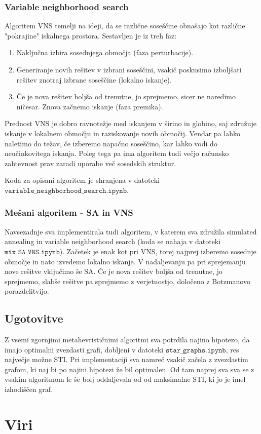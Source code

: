 \documentclass[a4paper,12pt]{article}
\begin{document}
\subsubsection{Variable neighborhood search}
Algoritem VNS temelji na ideji, da se različne soseščine obnašajo kot različne "pokrajine" iskalnega prostora. Sestavljen je iz treh faz:
\begin{enumerate}
      \item Naključna izbira sosednjega območja (faza perturbacije).
      \item Generiranje novih rešitev v izbrani soseščini, vsakič poskusimo izboljšati rešitev znotraj izbrane soseščine (lokalno iskanje).
      \item Če je nova rešitev boljša od trenutne, jo sprejmemo, sicer ne naredimo ničesar. Znova začnemo iskanje (faza premika).
\end{enumerate}
Prednost VNS je dobro ravnotežje med iskanjem v širino in globino, saj združuje iskanje v lokalnem območju in raziskovanje novih območij. Vendar
pa lahko naletimo do težav, če izberemo napačno soseščino, kar lahko vodi do neučinkovitega iskanja. Poleg tega pa ima algoritem tudi večjo
računsko zahtevnost prav zaradi uporabe več sosedskih struktur.

Koda za opisani algoritem je shranjena v datoteki \\$\texttt{variable\_neighborhood\_search.ipynb}$.

\subsubsection{Mešani algoritem - SA in VNS}
Navsezadnje sva implementirala tudi algoritem, v katerem sva združila simulated annealing in variable neighborhood search (koda se nahaja
v datoteki $\texttt{mix\_SA\_VNS.ipynb}$). Začetek je enak kot pri VNS, torej najprej izberemo sosednje območje in nato izvedemo lokalno iskanje. 
V nadaljevanju pa pri sprejemanju nove rešitve vključimo še SA. Če je nova rešitev boljša od trenutne, jo sprejmemo, slabše rešitve pa sprejmemo
z verjetnostjo, določeno z Botzmanovo porazdelitvijo. 

\subsection{Ugotovitve}
Z vsemi zgornjimi metahevrističnimi algoritmi sva potrdila najino hipotezo, da imajo optimalni zvezdasti grafi, dobljeni v datoteki 
$\texttt{star\_graphs.ipynb}$, res največje možne STI. Pri implementaciji sva namreč vsakič začela z zvezdastim grafom, ki naj 
bi po najini hipotezi že bil optimalen. Od tam naprej sva sva se z vsakim algoritmom le še bolj oddaljevala od od maksimalne STI, ki
jo je imel izhodiščen graf. 

\section{Viri}
\end{document}
